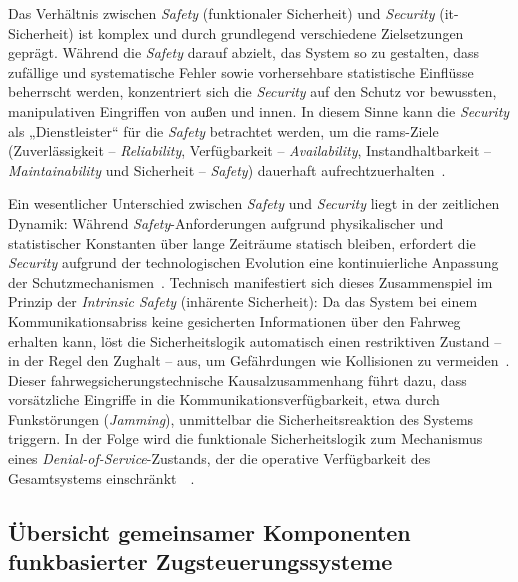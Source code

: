 \documentclass[runningheads]{res/llncs}
\begin{document}
Das Verhältnis zwischen \textit{Safety} (funktionaler Sicherheit) und \textit{Security} (\gls{it}-Sicherheit) ist komplex und durch grundlegend verschiedene Zielsetzungen geprägt. Während die \textit{Safety} darauf abzielt, das System so zu gestalten, dass zufällige und systematische Fehler sowie vorhersehbare statistische Einflüsse beherrscht werden, konzentriert sich die \textit{Security} auf den Schutz vor bewussten, manipulativen Eingriffen von außen und innen. 
In diesem Sinne kann die \textit{Security} als „Dienstleister“ für die \textit{Safety} betrachtet werden, um die \gls{rams}-Ziele (Zuverlässigkeit -- \textit{Reliability}, Verfügbarkeit -- \textit{Availability}, Instandhaltbarkeit -- \textit{Maintainability} und Sicherheit -- \textit{Safety}) dauerhaft aufrechtzuerhalten~\parencite[S. 204]{trinckaufETCS2024}. 

Ein wesentlicher Unterschied zwischen \textit{Safety} und \textit{Security} liegt in der zeitlichen Dynamik: Während \textit{Safety}-Anforderungen aufgrund physikalischer und statistischer Konstanten über lange Zeiträume statisch bleiben, erfordert die \textit{Security} aufgrund der technologischen Evolution eine kontinuierliche Anpassung der Schutzmechanismen~\parencite[S. 204]{trinckaufETCS2024}. 
Technisch manifestiert sich dieses Zusammenspiel im Prinzip der \textit{Intrinsic Safety} (inhärente Sicherheit): Da das System bei einem Kommunikationsabriss keine gesicherten Informationen über den Fahrweg erhalten kann, löst die Sicherheitslogik automatisch einen restriktiven Zustand – in der Regel den Zughalt – aus, um Gefährdungen wie Kollisionen zu vermeiden~\parencite[S. 56]{gaggeroSurvey2024}. Dieser fahrwegsicherungstechnische Kausalzusammenhang führt dazu, dass vorsätzliche Eingriffe in die Kommunikationsverfügbarkeit, etwa durch Funkstörungen (\textit{Jamming}), unmittelbar die Sicherheitsreaktion des Systems triggern. In der Folge wird die funktionale Sicherheitslogik zum Mechanismus eines \textit{Denial-of-Service}-Zustands, der die operative Verfügbarkeit des Gesamtsystems einschränkt~\parencite[S. 207]{trinckaufETCS2024}~\parencite[S. 56, 59]{gaggeroSurvey2024}.

\subsection{Übersicht gemeinsamer Komponenten funkbasierter Zugsteuerungssysteme}
\label{sec:Übersicht_gemeinsamer_Komponenten_funkbasierter_Zugsteuerungssysteme}
\end{document}
